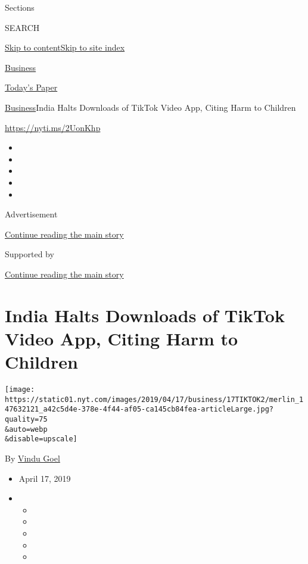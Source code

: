 Sections

SEARCH

\protect\hyperlink{site-content}{Skip to
content}\protect\hyperlink{site-index}{Skip to site index}

\href{https://www.nytimes.com/section/business}{Business}

\href{https://myaccount.nytimes.com/auth/login?response_type=cookie\&client_id=vi}{}

\href{https://www.nytimes.com/section/todayspaper}{Today's Paper}

\href{/section/business}{Business}\textbar{}India Halts Downloads of
TikTok Video App, Citing Harm to Children

\url{https://nyti.ms/2UonKhp}

\begin{itemize}
\item
\item
\item
\item
\item
\end{itemize}

Advertisement

\protect\hyperlink{after-top}{Continue reading the main story}

Supported by

\protect\hyperlink{after-sponsor}{Continue reading the main story}

\hypertarget{india-halts-downloads-of-tiktok-video-app-citing-harm-to-children}{%
\section{India Halts Downloads of TikTok Video App, Citing Harm to
Children}\label{india-halts-downloads-of-tiktok-video-app-citing-harm-to-children}}

\texttt{[image: https://static01.nyt.com/images/2019/04/17/business/17TIKTOK2/merlin\_147632121\_a42c5d4e-378e-4f44-af05-ca145cb84fea-articleLarge.jpg?quality=75\\\&auto=webp\\\&disable=upscale]}

By \href{https://www.nytimes.com/by/vindu-goel}{Vindu Goel}

\begin{itemize}
\item
  April 17, 2019
\item
  \begin{itemize}
  \item
  \item
  \item
  \item
  \item
  \end{itemize}
\end{itemize}


